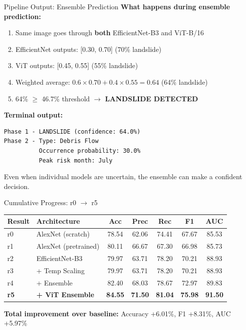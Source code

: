 \documentclass[aspectratio=169]{beamer}
\begin{document}
\begin{frame}[fragile]{Pipeline Output: Ensemble Prediction}
    \textbf{What happens during ensemble prediction:}
    \begin{enumerate}
        \item Same image goes through \textbf{both} EfficientNet-B3 and ViT-B/16
        \item EfficientNet outputs: [0.30, 0.70] (70\% landslide)
        \item ViT outputs: [0.45, 0.55] (55\% landslide)
        \item Weighted average: $0.6 \times 0.70 + 0.4 \times 0.55 = 0.64$ (64\% landslide)
        \item 64\% $\geq$ 46.7\% threshold $\to$ \textbf{LANDSLIDE DETECTED}
    \end{enumerate}

    \vspace{0.3cm}
    \textbf{Terminal output:}
    \begin{verbatim}
Phase 1 - LANDSLIDE (confidence: 64.0%)
Phase 2 - Type: Debris Flow
          Occurrence probability: 30.0%
          Peak risk month: July
    \end{verbatim}

    \small Even when individual models are uncertain, the ensemble can make a confident decision.
\end{frame}

\begin{frame}{Cumulative Progress: r0 $\to$ r5}
    \begin{table}
        \centering
        \renewcommand{\arraystretch}{1.2}
        \small
        \begin{tabular}{llccccc}
            \toprule
            \textbf{Result} & \textbf{Architecture} & \textbf{Acc} & \textbf{Prec} & \textbf{Rec} & \textbf{F1} & \textbf{AUC} \\
            \midrule
            r0 & AlexNet (scratch) & 78.54 & 62.06 & 74.41 & 67.67 & 85.53 \\
            r1 & AlexNet (pretrained) & 80.11 & 66.67 & 67.30 & 66.98 & 85.73 \\
            r2 & EfficientNet-B3 & 79.97 & 63.71 & 78.20 & 70.21 & 88.93 \\
            r3 & + Temp Scaling & 79.97 & 63.71 & 78.20 & 70.21 & 88.93 \\
            r4 & + Ensemble & 82.40 & 68.03 & 78.67 & 72.97 & 89.83 \\
            \textbf{r5} & \textbf{+ ViT Ensemble} & \textbf{84.55} & \textbf{71.50} & \textbf{81.04} & \textbf{75.98} & \textbf{91.50} \\
            \bottomrule
        \end{tabular}
    \end{table}

    \vspace{0.3cm}
    \textbf{Total improvement over baseline:}
    Accuracy +6.01\%, F1 +8.31\%, AUC +5.97\%
\end{frame}
\end{document}
